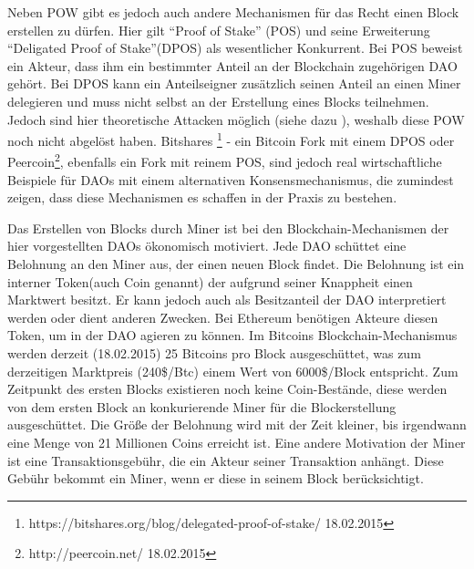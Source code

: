 \documentclass[a4paper,12pt]{report}
\begin{document}


Neben POW gibt es jedoch auch andere Mechanismen für das Recht einen Block erstellen zu dürfen. Hier gilt ``Proof of Stake'' (POS) und seine Erweiterung ``Deligated Proof of Stake''(DPOS) als wesentlicher Konkurrent. Bei POS beweist ein Akteur, dass ihm ein bestimmter Anteil an der Blockchain zugehörigen DAO gehört. Bei  DPOS kann ein Anteilseigner zusätzlich seinen Anteil an einen Miner delegieren und muss nicht selbst an der Erstellung eines Blocks teilnehmen. Jedoch sind hier theoretische Attacken möglich (siehe dazu \cite{EthereumBlogPOS} \cite{Vasant2015}), weshalb diese POW noch nicht abgelöst haben. Bitshares \footnote{https://bitshares.org/blog/delegated-proof-of-stake/ 18.02.2015} - ein Bitcoin Fork mit einem DPOS oder Peercoin\footnote{http://peercoin.net/ 18.02.2015}, ebenfalls ein Fork mit reinem POS, sind jedoch real wirtschaftliche Beispiele für DAOs mit einem alternativen Konsensmechanismus, die zumindest zeigen, dass diese Mechanismen es schaffen in der Praxis zu bestehen.

Das Erstellen von Blocks durch Miner ist bei den Blockchain-Mechanismen der hier vorgestellten DAOs ökonomisch motiviert. Jede DAO schüttet eine Belohnung an den Miner aus, der einen neuen Block findet. Die Belohnung ist ein interner Token(auch Coin genannt) der aufgrund seiner Knappheit einen Marktwert besitzt. Er kann jedoch auch als Besitzanteil der DAO interpretiert werden oder dient anderen Zwecken. Bei Ethereum benötigen Akteure diesen Token, um in der DAO agieren zu können. Im Bitcoins Blockchain-Mechanismus werden derzeit (18.02.2015) 25 Bitcoins pro Block ausgeschüttet, was zum derzeitigen Marktpreis (240\$/Btc) einem Wert von 6000\$/Block entspricht.  
Zum Zeitpunkt des ersten Blocks existieren noch keine Coin-Bestände, diese werden von dem ersten Block an konkurierende Miner für die Blockerstellung ausgeschüttet. Die Größe der Belohnung wird mit der Zeit kleiner, bis irgendwann eine Menge von 21 Millionen Coins erreicht ist. Eine andere Motivation der Miner ist eine Transaktionsgebühr, die ein Akteur seiner Transaktion anhängt. Diese Gebühr bekommt ein Miner, wenn er diese in seinem Block berücksichtigt.
\end{document}
